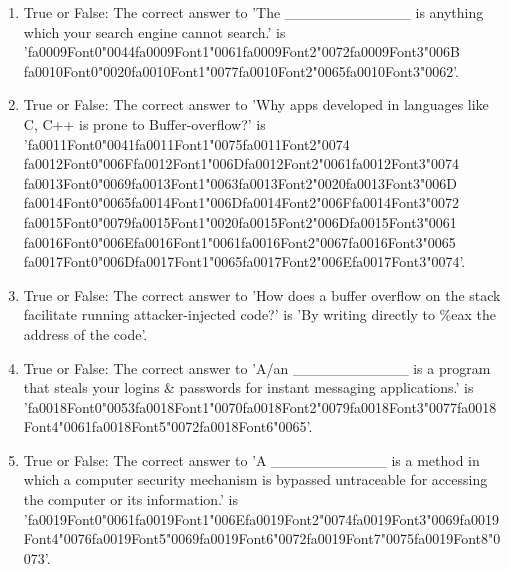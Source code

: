 \documentclass[12pt]{article}
\begin{document}
\begin{enumerate}[label=\arabic*.]
\item True or False: The correct answer to 'The \_\_\_\_\_\_\_\_\_\_\_\_ is anything which your search engine cannot search.' is '{\csname fa0009Font0\endcsname\char"0044}{\csname fa0009Font1\endcsname\char"0061}{\csname fa0009Font2\endcsname\char"0072}{\csname fa0009Font3\endcsname\char"006B} {\csname fa0010Font0\endcsname\char"0020}{\csname fa0010Font1\endcsname\char"0077}{\csname fa0010Font2\endcsname\char"0065}{\csname fa0010Font3\endcsname\char"0062}'.
\item True or False: The correct answer to 'Why apps developed in languages like C, C++ is prone to Buffer-overflow?' is '{\csname fa0011Font0\endcsname\char"0041}{\csname fa0011Font1\endcsname\char"0075}{\csname fa0011Font2\endcsname\char"0074} {\csname fa0012Font0\endcsname\char"006F}{\csname fa0012Font1\endcsname\char"006D}{\csname fa0012Font2\endcsname\char"0061}{\csname fa0012Font3\endcsname\char"0074} {\csname fa0013Font0\endcsname\char"0069}{\csname fa0013Font1\endcsname\char"0063}{\csname fa0013Font2\endcsname\char"0020}{\csname fa0013Font3\endcsname\char"006D} {\csname fa0014Font0\endcsname\char"0065}{\csname fa0014Font1\endcsname\char"006D}{\csname fa0014Font2\endcsname\char"006F}{\csname fa0014Font3\endcsname\char"0072} {\csname fa0015Font0\endcsname\char"0079}{\csname fa0015Font1\endcsname\char"0020}{\csname fa0015Font2\endcsname\char"006D}{\csname fa0015Font3\endcsname\char"0061} {\csname fa0016Font0\endcsname\char"006E}{\csname fa0016Font1\endcsname\char"0061}{\csname fa0016Font2\endcsname\char"0067}{\csname fa0016Font3\endcsname\char"0065} {\csname fa0017Font0\endcsname\char"006D}{\csname fa0017Font1\endcsname\char"0065}{\csname fa0017Font2\endcsname\char"006E}{\csname fa0017Font3\endcsname\char"0074}'.
\item True or False: The correct answer to 'How does a buffer overflow on the stack facilitate running attacker-injected code?' is 'By writing directly to \%eax the address of the code'.
\item True or False: The correct answer to 'A/an \_\_\_\_\_\_\_\_\_\_\_ is a program that steals your logins \& passwords for instant messaging applications.' is '{\csname fa0018Font0\endcsname\char"0053}{\csname fa0018Font1\endcsname\char"0070}{\csname fa0018Font2\endcsname\char"0079}{\csname fa0018Font3\endcsname\char"0077}{\csname fa0018Font4\endcsname\char"0061}{\csname fa0018Font5\endcsname\char"0072}{\csname fa0018Font6\endcsname\char"0065}'.
\item True or False: The correct answer to 'A \_\_\_\_\_\_\_\_\_\_\_ is a method in which a computer security mechanism is bypassed untraceable for accessing the computer or its information.' is '{\csname fa0019Font0\endcsname\char"0061}{\csname fa0019Font1\endcsname\char"006E}{\csname fa0019Font2\endcsname\char"0074}{\csname fa0019Font3\endcsname\char"0069}{\csname fa0019Font4\endcsname\char"0076}{\csname fa0019Font5\endcsname\char"0069}{\csname fa0019Font6\endcsname\char"0072}{\csname fa0019Font7\endcsname\char"0075}{\csname fa0019Font8\endcsname\char"0073}'.

\end{enumerate}
\end{document}
